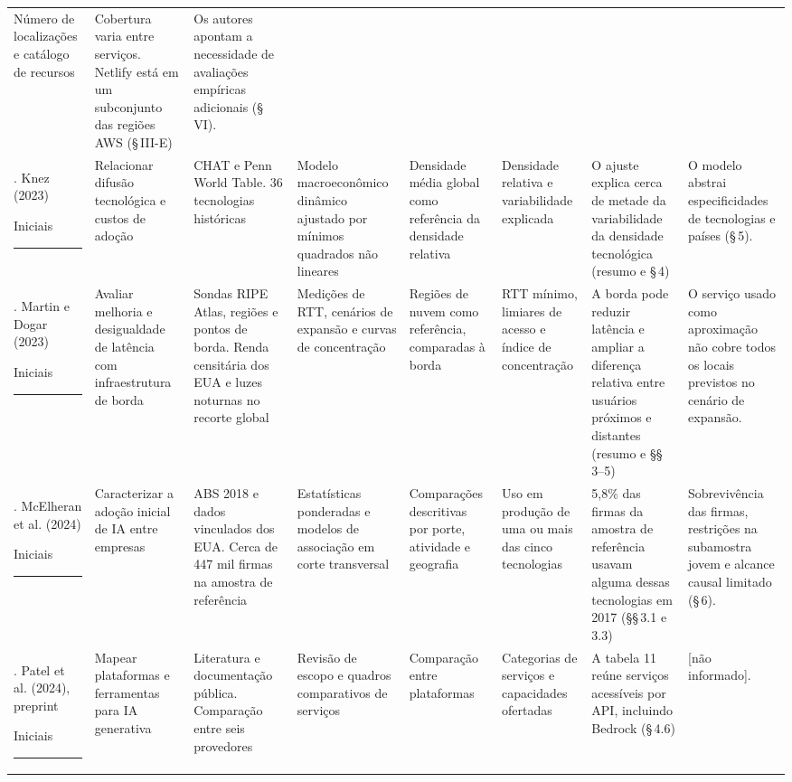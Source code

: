 \documentclass[12pt,a4paper]{article}
\newcommand{\naoinformado}{[não informado]}
\newcommand{\iniciais}{\par\smallskip Iniciais \rule{0.9cm}{0.35pt}}
\begin{document}
\begin{landscape}
{\begin{longtable}{@{}P{2.5cm}P{2.7cm}P{3.65cm}P{2.7cm}P{2.35cm}P{2.35cm}P{3.7cm}P{2.95cm}@{}}
Número de localizações e catálogo de recursos &
Cobertura varia entre serviços. Netlify está em um subconjunto das regiões AWS (\S\,III-E) &
Os autores apontam a necessidade de avaliações empíricas adicionais (\S\,VI).\\
. Knez (2023)\iniciais &
Relacionar difusão tecnológica e custos de adoção &
CHAT e Penn World Table. 36 tecnologias históricas &
Modelo macroeconômico dinâmico ajustado por mínimos quadrados não lineares &
Densidade média global como referência da densidade relativa &
Densidade relativa e variabilidade explicada &
O ajuste explica cerca de metade da variabilidade da densidade tecnológica (resumo e \S\,4) &
O modelo abstrai especificidades de tecnologias e países (\S\,5).\\
. Martin e Dogar (2023)\iniciais &
Avaliar melhoria e desigualdade de latência com infraestrutura de borda &
Sondas RIPE Atlas, regiões e pontos de borda. Renda censitária dos EUA e luzes noturnas no recorte global &
Medições de RTT, cenários de expansão e curvas de concentração &
Regiões de nuvem como referência, comparadas à borda &
RTT mínimo, limiares de acesso e índice de concentração &
A borda pode reduzir latência e ampliar a diferença relativa entre usuários próximos e distantes (resumo e \S\S\,3--5) &
O serviço usado como aproximação não cobre todos os locais previstos no cenário de expansão.\\
. McElheran et al. (2024)\iniciais &
Caracterizar a adoção inicial de IA entre empresas &
ABS 2018 e dados vinculados dos EUA. Cerca de 447 mil firmas na amostra de referência &
Estatísticas ponderadas e modelos de associação em corte transversal &
Comparações descritivas por porte, atividade e geografia &
Uso em produção de uma ou mais das cinco tecnologias &
5,8\% das firmas da amostra de referência usavam alguma dessas tecnologias em 2017 (\S\S\,3.1 e 3.3) &
Sobrevivência das firmas, restrições na subamostra jovem e alcance causal limitado (\S\,6).\\
. Patel et al. (2024), preprint\iniciais &
Mapear plataformas e ferramentas para IA generativa &
Literatura e documentação pública. Comparação entre seis provedores &
Revisão de escopo e quadros comparativos de serviços &
Comparação entre plataformas &
Categorias de serviços e capacidades ofertadas &
A tabela 11 reúne serviços acessíveis por API, incluindo Bedrock (\S\,4.6) &
\naoinformado.\\
\end{longtable}
}
\end{landscape}
\end{document}
